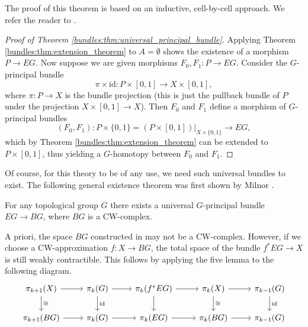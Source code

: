 The proof of this theorem is based on an inductive, cell-by-cell approach. We refer the reader to \cite[Thm. 2.7.1]{ebert_bordism_script}. 

\begin{proof}[Proof of Theorem \ref{bundles:thm:universal_principal_bundle}]
    Applying Theorem \ref{bundles:thm:extension_theorem} to $A = \emptyset$ shows the existence of a morphism $P \to EG$. Now suppose we are given morphisms $F_0,F_1 \colon P \to EG$. Consider the $G$-principal bundle 
    \[
    \pi \times \mathrm{id} \colon P \times [0,1] \to X \times [0,1],
    \]
    where $\pi \colon P \to X$ is the bundle projection (this is just the pullback bundle of $P$ under the projection $X \times [0,1] \to X$). Then $F_0$ and $F_1$ define a morphism of $G$-principal bundles 
    \[
    (F_0,F_1) \colon P \times \{0,1\} = (P \times [0,1])|_{X \times \{0,1\}}\to EG,
    \]
    which by Theorem \ref{bundles:thm:extension_theorem} can be extended to $P \times [0,1]$, thus yielding a $G$-homotopy between $F_0$ and $F_1$.
\end{proof}

Of course, for this theory to be of any use, we need such universal bundles to exist. The following general existence theorem was first shown by Milnor \cite{milnor1956universalII}.

\begin{theorem}
    For any topological group $G$ there exists a universal $G$-principal bundle $EG \to BG$, where $BG$ is a CW-complex.
\end{theorem}

A priori, the space $BG$ constructed in \cite{milnor1956universalII} may not be a CW-complex. However, if we choose a CW-approximation $f \colon X \to BG$, the total space of the bundle $f^\ast EG \to X$ is still weakly contractible. This follows by applying the five lemma to the following diagram.
\[\begin{tikzcd}
	{\pi_{k+1}(X)} & {\pi_k(G)} & {\pi_k(f^\ast EG)} & {\pi_k(X)} & {\pi_{k-1}(G)} \\
	{\pi_{k+1}(BG)} & {\pi_k(G)} & {\pi_k(EG)} & {\pi_k(BG)} & {\pi_{k-1}(G)}
	\arrow[from=1-1, to=1-2]
	\arrow["\cong", from=1-1, to=2-1]
	\arrow[from=1-2, to=1-3]
	\arrow["{\mathrm{id}}", from=1-2, to=2-2]
	\arrow[from=1-3, to=1-4]
	\arrow[from=1-3, to=2-3]
	\arrow[from=1-4, to=1-5]
	\arrow["\cong", from=1-4, to=2-4]
	\arrow["{\mathrm{id}}", from=1-5, to=2-5]
	\arrow[from=2-1, to=2-2]
	\arrow[from=2-2, to=2-3]
	\arrow[from=2-3, to=2-4]
	\arrow[from=2-4, to=2-5]
\end{tikzcd}\]

